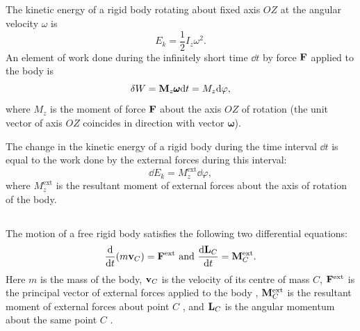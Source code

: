 \subsection{}\label{4.3.5} The kinetic energy of a rigid body rotating about fixed axis $OZ$ at the angular velocity $\omega$ is
\begin{equation*}%
E_{k} =  \frac{1}{2} I_{z} \omega^{2}.
\end{equation*}
An element of work done during the infinitely short time $\dd t$ by force $\vb{F}$ applied to the body is
\begin{equation*}%
\delta W = \vb{M}_{z} \pmb{\omega} \dd t = M_{z} \dd \varphi,
\end{equation*}
where $M_{z}$ is the moment of force $\vb{F}$ about the axis $OZ$ of rota­tion (the unit vector of axis $OZ$ coincides in direction with vector $\pmb{\omega}$).

The change in the kinetic energy of a rigid body during the time interval $\dd t$ is equal to the work done by the external forces during this interval:
\begin{equation*}%
\dd E_{k} = M^{\textrm{ext}}_{z} \dd \varphi,
\end{equation*}
where $M^{\textrm{ext}}_{z}$ is the resultant moment of external forces about the axis of rotation of the body.

\subsection{}\label{4.3.6} The motion of a free rigid body satisfies the following two differential equations:
\begin{equation*}%
\dv{t}(m\vb{v}_{C}) = \vb{F}^{\textrm{ext}} \,\, \textrm{and}\,\,\dv{\vb{L}_{C}}{t} = \vb{M}^{\textrm{ext}}_{C}.
\end{equation*}
Here $m$ is the mass of the body, $\vb{v}_{C}$ is the velocity of its centre of mass $C$, $ \vb{F}^{\textrm{ext}}$ is the principal vector of external forces applied
to the body , $\vb{M}^{\textrm{ext}}_{C}$ is the resultant moment of external forces about point $C$ , and $\vb{L}_{C}$ is the angular momentum about the same point $C$ .

